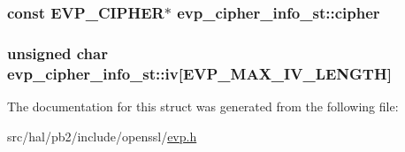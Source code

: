 \subsubsection[{\texorpdfstring{cipher}{cipher}}]{\setlength{\rightskip}{0pt plus 5cm}const {\bf E\+V\+P\+\_\+\+C\+I\+P\+H\+ER}$\ast$ evp\+\_\+cipher\+\_\+info\+\_\+st\+::cipher}\hypertarget{structevp__cipher__info__st_a54d5bc0202fbebadb925e7e87e7ee544}{}\label{structevp__cipher__info__st_a54d5bc0202fbebadb925e7e87e7ee544}
\subsubsection[{\texorpdfstring{iv}{iv}}]{\setlength{\rightskip}{0pt plus 5cm}unsigned char evp\+\_\+cipher\+\_\+info\+\_\+st\+::iv\mbox{[}{\bf E\+V\+P\+\_\+\+M\+A\+X\+\_\+\+I\+V\+\_\+\+L\+E\+N\+G\+TH}\mbox{]}}\hypertarget{structevp__cipher__info__st_a579960a9fa646b1f82ecf67293c8a819}{}\label{structevp__cipher__info__st_a579960a9fa646b1f82ecf67293c8a819}


The documentation for this struct was generated from the following file\+:\begin{DoxyCompactItemize}
\item 
src/hal/pb2/include/openssl/\hyperlink{evp_8h}{evp.\+h}\end{DoxyCompactItemize}
